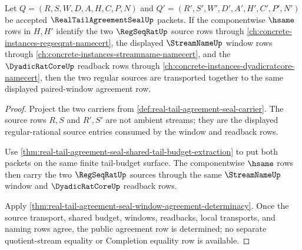 \begin{theorem}
\label{thm:real-tail-agreement-seal-regular-source-transport}
Let $Q=(R,S,W,D,A,H,C,P,N)$ and $Q'=(R',S',W',D',A',H',C',P',N')$ be accepted $\RealTailAgreementSealUp$ packets. If the componentwise $\hsame$ rows in $H,H'$ identify the two $\RegSeqRatUp$ source rows through \autoref{ch:concrete-instances-regseqrat-namecert}, the displayed $\StreamNameUp$ window rows through \autoref{ch:concrete-instances-streamname-namecert}, and the $\DyadicRatCoreUp$ readback rows through \autoref{ch:concrete-instances-dyadicratcore-namecert}, then the two regular sources are transported together to the same displayed paired-window agreement row.
\end{theorem}
\begin{proof}
Project the two carriers from \autoref{def:real-tail-agreement-seal-carrier}. The source rows $R,S$ and $R',S'$ are not ambient streams; they are the displayed regular-rational source entries consumed by the window and readback rows.

Use \autoref{thm:real-tail-agreement-seal-shared-tail-budget-extraction} to put both packets on the same finite tail-budget surface. The componentwise $\hsame$ rows then carry the two $\RegSeqRatUp$ sources through the same $\StreamNameUp$ window and $\DyadicRatCoreUp$ readback rows.

Apply \autoref{thm:real-tail-agreement-seal-window-agreement-determinacy}. Once the source transport, shared budget, windows, readbacks, local transports, and naming rows agree, the public agreement row is determined; no separate quotient-stream equality or Completion equality row is available.
\end{proof}

